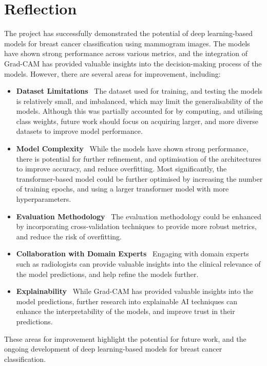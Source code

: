 \documentclass[../main]{subfiles}
\begin{document}
\section{Reflection}
\label{sec:reflection}
The project has successfully demonstrated the potential of deep learning-based models for breast cancer classification using mammogram images. The models have shown strong performance across various metrics, and the integration of Grad-CAM has provided valuable insights into the decision-making process of the models. However, there are several areas for improvement, including:
\begin{itemize}
    \item \textbf{Dataset Limitations} \textemdash\ The dataset used for training, and testing the models is relatively small, and imbalanced, which may limit the generalisability of the models. Although this was partially accounted for by computing, and utilising class weights, future work should focus on acquiring larger, and more diverse datasets to improve model performance.
    \item \textbf{Model Complexity} \textemdash\ While the models have shown strong performance, there is potential for further refinement, and optimisation of the architectures to improve accuracy, and reduce overfitting. Most significantly, the transformer-based model could be further optimised by increasing the number of training epochs, and using a larger transformer model with more hyperparameters.
    \item \textbf{Evaluation Methodology} \textemdash\ The evaluation methodology could be enhanced by incorporating cross-validation techniques to provide more robust metrics, and reduce the risk of overfitting.
    \item \textbf{Collaboration with Domain Experts} \textemdash\ Engaging with domain experts such as radiologists can provide valuable insights into the clinical relevance of the model predictions, and help refine the models further.
    \item \textbf{Explainability} \textemdash\ While Grad-CAM has provided valuable insights into the model predictions, further research into explainable AI techniques can enhance the interpretability of the models, and improve trust in their predictions.
\end{itemize}
These areas for improvement highlight the potential for future work, and the ongoing development of deep learning-based models for breast cancer classification.
\end{document}
